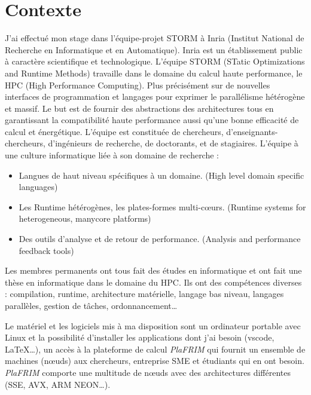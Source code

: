 \section{Contexte}
J'ai effectué mon stage dans l'équipe-projet STORM à Inria (Institut National de
Recherche en Informatique et en Automatique). Inria est un établissement public à
caractère scientifique et technologique.
L'équipe STORM (STatic Optimizations and Runtime Methods) travaille dans le domaine du
calcul haute performance, le HPC (High Performance Computing). Plus précisément sur
de  nouvelles interfaces de programmation et langages pour exprimer le parallélisme
hétérogène et massif. Le but est de fournir des abstractions des architectures tous en
garantissant la compatibilité haute performance aussi qu'une bonne efficacité de calcul
et énergétique.
L'équipe est constituée de chercheurs, d'enseignants-chercheurs, d'ingénieurs de recherche,
de doctorants, et de stagiaires.
L'équipe à une culture informatique liée à son domaine de recherche :

\begin{itemize}
  \item Langues de haut niveau spécifiques à un domaine. (High level domain specific languages)
  \item Les Runtime hétérogènes, les plates-formes multi-cœurs. (Runtime systems for heterogeneous, manycore platforms)
  \item Des outils d'analyse et de retour de performance. (Analysis and performance feedback tools)
\end{itemize}

Les membres permanents ont tous fait des études en informatique et ont fait une thèse en
informatique dans le domaine du HPC. Ils ont des compétences diverses : compilation, runtime,
architecture matérielle, langage bas niveau, langages parallèles, gestion de tâches, ordonnancement\dots

Le matériel et les logiciels mis à ma disposition sont un ordinateur portable avec Linux
et la possibilité d'installer les applications dont j'ai besoin (vscode, \LaTeX\dots), un
accès à la plateforme de calcul \emph{PlaFRIM} qui fournit un ensemble de machines (nœuds)
aux chercheurs, entreprise SME et étudiants qui en ont besoin. \emph{PlaFRIM} comporte une
multitude de nœuds avec des architectures différentes (SSE, AVX, ARM NEON\dots).
